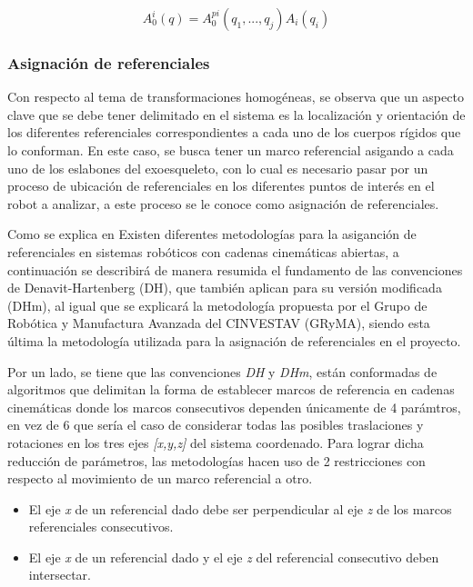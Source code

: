         \begin{equation}
            A^i_0(q) =  A^{pi}_0(q_1,...,q_j)A_i(q_i)
            \label{eq:CD}
        \end{equation}

    \subsubsection{Asignación de referenciales}
        Con respecto al tema de transformaciones homogéneas, se observa que un 
        aspecto clave que se debe tener delimitado en el sistema es la localización 
        y orientación de los diferentes referenciales correspondientes a cada uno de 
        los cuerpos rígidos que lo conforman. En este caso, se busca tener un marco 
        referencial asigando a cada uno de los eslabones del exoesqueleto, con lo cual es 
        necesario pasar por un proceso de ubicación de referenciales en los diferentes 
        puntos de interés en el robot a analizar, a este proceso se le conoce como 
        asignación de referenciales.

        Como se explica en \cite{3DMotion} Existen diferentes metodologías para la asiganción 
        de referenciales en sistemas robóticos con cadenas cinemáticas abiertas, a 
        continuación se describirá de manera resumida el fundamento de las convenciones de 
        Denavit-Hartenberg (DH), que también aplican para su versión modificada (DHm), 
        al igual que se explicará la metodología propuesta por el Grupo de Robótica y 
        Manufactura Avanzada del CINVESTAV (GRyMA), siendo esta última la metodología 
        utilizada para la asignación de referenciales en el proyecto.

        Por un lado, se tiene que las convenciones \emph{DH} y \emph{DHm}, están conformadas 
        de algoritmos que delimitan la forma de establecer marcos de referencia en 
        cadenas cinemáticas donde los marcos consecutivos dependen únicamente de 4 parámtros, 
        en vez de 6 que sería el caso de considerar todas las posibles traslaciones y rotaciones 
        en los tres ejes \emph{[x,y,z]} del sistema coordenado. Para lograr dicha reducción de 
        parámetros, las metodologías hacen uso de 2 restricciones con respecto al movimiento de 
        un marco referencial a otro.

        \begin{itemize}
            \item El eje \emph{x} de un referencial dado debe ser perpendicular al eje \emph{z} de los marcos referenciales consecutivos.
            \item El eje \emph{x} de un referencial dado y el eje \emph{z} del referencial consecutivo deben intersectar.
        \end{itemize}

